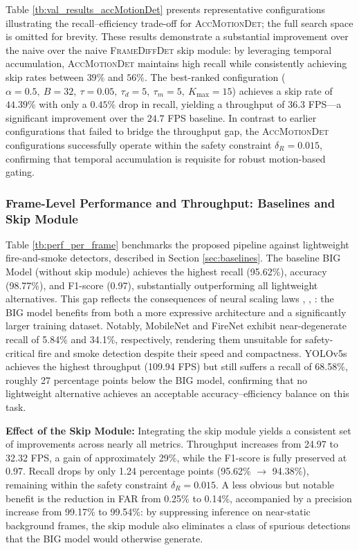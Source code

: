\documentclass[
  10pt,
]{article}
\begin{document}
Table \ref{tb:val_results_accMotionDet} presents representative
configurations illustrating the recall--efficiency trade-off for
\textsc{AccMotionDet}; the full search space is omitted for brevity.
These results demonstrate a substantial improvement over the naive over
the naive \textsc{FrameDiffDet} skip module: by leveraging temporal
accumulation, \textsc{AccMotionDet} maintains high recall while
consistently achieving skip rates between \(39\%\) and \(56\%\). The
best-ranked configuration (\(\alpha{=}0.5,\ B{=}32,\ \tau{=}0.05,\
\tau_d{=}5,\ \tau_m{=}5,\ K_{\max}{=}15\)) achieves a skip rate of
\(44.39\%\) with only a \(0.45\%\) drop in recall, yielding a throughput
of \(36.3\) FPS---a significant improvement over the \(24.7\) FPS
baseline. In contrast to earlier configurations that failed to bridge
the throughput gap, the \textsc{AccMotionDet} configurations
successfully operate within the safety constraint \(\delta_R = 0.015\),
confirming that temporal accumulation is requisite for robust
motion-based gating.

\subsubsection{Frame-Level Performance and Throughput: Baselines and
Skip Module}\label{sec:e2e-perf}



Table \ref{tb:perf_per_frame} benchmarks the proposed pipeline against
lightweight fire-and-smoke detectors, described in Section
\ref{sec:baselines}. The baseline BIG Model (without skip module)
achieves the highest recall (95.62\%), accuracy (98.77\%), and F1-score
(0.97), substantially outperforming all lightweight alternatives. This
gap reflects the consequences of neural scaling laws
,
,
: the BIG model benefits
from both a more expressive architecture and a significantly larger
training dataset. Notably, MobileNet and FireNet exhibit near-degenerate
recall of 5.84\% and 34.1\%, respectively, rendering them unsuitable for
safety-critical fire and smoke detection despite their speed and
compactness. YOLOv5s achieves the highest throughput (109.94 FPS) but
still suffers a recall of 68.58\%, roughly 27 percentage points below
the BIG model, confirming that no lightweight alternative achieves an
acceptable accuracy--efficiency balance on this task.

\textbf{Effect of the Skip Module:} Integrating the skip module yields a
consistent set of improvements across nearly all metrics. Throughput
increases from 24.97 to 32.32 FPS, a gain of approximately 29\%, while
the F1-score is fully preserved at 0.97. Recall drops by only 1.24
percentage points (95.62\% \(\to\) 94.38\%), remaining within the safety
constraint \(\delta_R = 0.015\). A less obvious but notable benefit is
the reduction in FAR from 0.25\% to 0.14\%, accompanied by a precision
increase from 99.17\% to 99.54\%: by suppressing inference on
near-static background frames, the skip module also eliminates a class
of spurious detections that the BIG model would otherwise generate.
\end{document}
